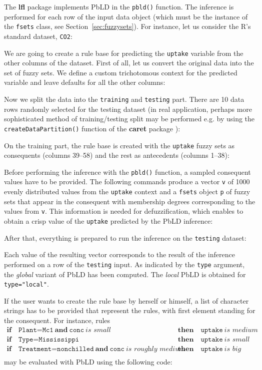 \documentclass[review]{elsarticle}
\newcommand{\pkg}[1]{\textbf{#1}}
\newcommand{\proglang}[1]{#1}
\newcommand{\code}[1]{\texttt{#1}}
\newcommand{\R}{\proglang{R}}
\begin{document}
The \pkg{lfl} package implements PbLD in the \code{pbld()} function. The inference is performed for each row of the input data object (which must be the instance of the \code{fsets} class, see Section~\ref{sec:fuzzysets}). For instance, let us consider the \R{}'s standard dataset, \code{CO2}:
%

%
We are going to create a rule base for predicting the \code{uptake} variable from the other columns of the dataset. First of all, let us convert the original data into the set of fuzzy sets. We define a custom trichotomous context for the predicted variable and leave defaults for all the other columns:
%

%
Now we split the data into the \code{training} and \code{testing} part. There are 10 data rows randomly selected for the testing dataset (in real application, perhaps more sophisticated method of training/testing split may be performed e.g. by using the \code{createDataPartition()} function of the \pkg{caret} package \citep{caretPkg}):
%

%
On the training part, the rule base is created with the \code{uptake} fuzzy sets as consequents (columns 39--58) and the rest as antecedents (columns 1--38):
%

%
Before performing the inference with the \code{pbld()} function, a sampled consequent values have to be provided. The following commands produce a vector \code{v} of 1000 evenly distributed values from the \code{uptake} context and a \code{fsets} object \code{p} of fuzzy sets that appear in the consequent with membership degrees corresponding to the values from \code{v}. This information is needed for defuzzification, which enables to obtain a crisp value of the \code{uptake} predicted by the PbLD inference:
%

%
After that, everything is prepared to run the inference on the \code{testing} dataset:
%



Each value of the resulting vector corresponds to the result of the inference performed on a row of the \code{testing} input. As indicated by the \code{type} argument, the \emph{global} variant of PbLD has been computed. The \emph{local} PbLD is obtained for \code{type="local"}.

If the user wants to create the rule base by herself or himself, a list of character strings has to be provided that represent the rules, with first element standing for the consequent. For instance,
rules
\begin{align*}
    \textbf{if}\quad \texttt{Plant=Mc1}\ \textbf{and}\ \texttt{conc}\ \textit{is small} & \quad \textbf{then}\quad \texttt{uptake}\ \textit{is medium} \\
    \textbf{if}\quad \texttt{Type=Mississippi} & \quad \textbf{then}\quad \texttt{uptake}\ \textit{is small} \\
    \textbf{if}\quad \texttt{Treatment=nonchilled}\ \textbf{and}\ \texttt{conc}\ \textit{is roughly medium} & \quad\textbf{then}\quad \texttt{uptake}\ \textit{is big} \\
\end{align*}
may be evaluated with PbLD using the following code:
%

%
\end{document}
